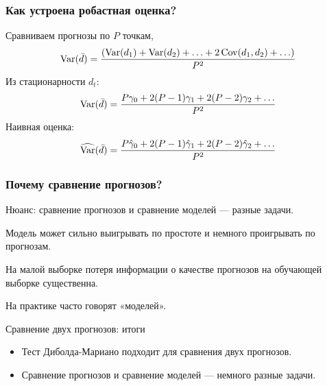 \begin{frame}
  \frametitle{Как устроена робастная оценка?}
  
  Сравниваем прогнозы по $P$ точкам, 
  \[
  \operatorname{Var}(\bar d) = \frac{(\operatorname{Var}(d_1) + \operatorname{Var}(d_2) + \ldots + 2\operatorname{Cov}(d_1, d_2) + \ldots)}{P^2}
  \]\pause
  Из стационарности $d_t$:
  \[
    \operatorname{Var}(\bar d) = \frac{P\gamma_0 + 2(P-1) \gamma_1 + 2(P-2)\gamma_2 +\ldots}{P^2} 
  \]\pause 
  Наивная оценка:
  \[
    \widehat{\operatorname{Var}}(\bar d) = \frac{ P\hat\gamma_0 + 2(P-1) \hat\gamma_1 + 2(P-2)\hat\gamma_2 +\ldots}{P^2}
  \]
\end{frame}



\begin{frame}
    \frametitle{Почему сравнение прогнозов?}

    \alert{Нюанс}: сравнение прогнозов и сравнение моделей — разные задачи. 
    \pause

    Модель может сильно выигрывать \alert{по простоте} и немного проигрывать по прогнозам.
    \pause 

    На малой выборке \alert{потеря информации} о качестве прогнозов на обучающей выборке существенна. 
    \pause 

    На практике часто \alert{говорят «моделей»}.
\end{frame}


\begin{frame}{Сравнение двух прогнозов: итоги}

  \begin{itemize}[<+->]
    \item Тест Диболда-Мариано подходит для сравнения \alert{двух} прогнозов. 
    \item Сравнение прогнозов и сравнение моделей — \alert{немного разные} задачи.  
  \end{itemize}
\end{frame}


